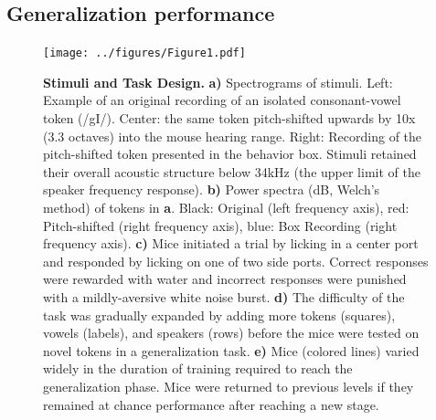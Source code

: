 \documentclass[preprint, NumberedRefs]{JASAnew}\usepackage[]{graphicx}\usepackage[]{color}
\begin{document}
\subsection{Generalization performance}

\begin{figure}
\texttt{[image: ../figures/Figure1.pdf]}
\caption{\label{spectro}{\textbf{Stimuli and Task Design.} \textbf{a)} Spectrograms of stimuli. Left: Example of an original recording of an isolated consonant-vowel token (/gI/). Center: the same token pitch-shifted upwards by 10x (3.3 octaves) into the mouse hearing range. Right: Recording of the pitch-shifted token presented in the behavior box. Stimuli retained their overall acoustic structure below 34kHz (the upper limit of the speaker frequency response). \textbf{b)} Power spectra (dB, Welch's method) of tokens in \textbf{a}. Black: Original (left frequency axis), red: Pitch-shifted (right frequency axis), blue: Box Recording (right frequency axis). \textbf{c)} Mice initiated a trial by licking in a center port and responded by licking on one of two side ports. Correct responses were rewarded with water and incorrect responses were punished with a mildly-aversive white noise burst. \textbf{d)} The difficulty of the task was gradually expanded by adding more tokens (squares), vowels (labels), and speakers (rows) before the mice were tested on novel tokens in a generalization task. \textbf{e)} Mice (colored lines) varied widely in the duration of training required to reach the generalization phase. Mice were returned to previous levels if they remained at chance performance after reaching a new stage.
}}
\end{figure}
%
%
%
\end{document}
